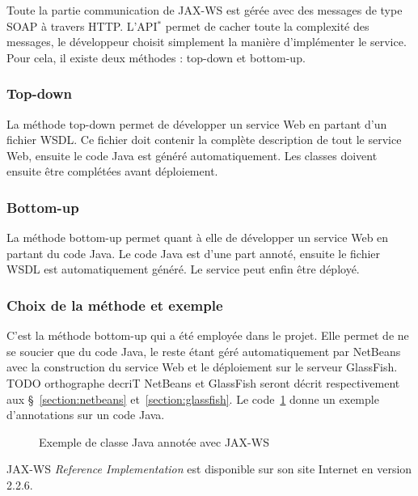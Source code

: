 Toute la partie communication de JAX-WS est g\'er\'ee avec des messages de type SOAP \`a travers HTTP.
L'API$^*$ permet de cacher toute la complexit\'e des messages, le d\'eveloppeur choisit simplement la mani\`ere d'impl\'ementer le service. 
Pour cela, il existe deux m\'ethodes : top-down et bottom-up.

\subsubsection{Top-down}

La m\'ethode top-down permet de d\'evelopper un service Web en partant d'un fichier WSDL.
Ce fichier doit contenir la compl\`ete description de tout le service Web, ensuite le code Java est g\'en\'er\'e automatiquement.
Les classes doivent ensuite \^etre compl\'et\'ees avant d\'eploiement.

\subsubsection{Bottom-up}

La m\'ethode bottom-up permet quant \`a elle de d\'evelopper un service Web en partant du code Java.
Le code Java est d'une part annot\'e, ensuite le fichier WSDL est automatiquement g\'en\'er\'e.
Le service peut enfin \^etre d\'eploy\'e.

\subsubsection{Choix de la m\'ethode et exemple}

C'est la m\'ethode bottom-up qui a \'et\'e employ\'ee dans le projet.
Elle permet de ne se soucier que du code Java, le reste \'etant g\'er\'e automatiquement par NetBeans avec la construction du service Web et le d\'eploiement sur le serveur GlassFish.
TODO orthographe decriT
NetBeans et GlassFish seront d\'ecrit respectivement aux \S~\ref{section:netbeans} et~\ref{section:glassfish}.
Le code~\ref{code:exempleJAXWS} donne un exemple d'annotations sur un code Java.

\vspace{0.20cm}

\begin{figure}[!ht]
	
	\caption{Exemple de classe Java annot\'ee avec JAX-WS}
	\label{code:exempleJAXWS}

\end{figure}

\vspace{0.20cm}

JAX-WS \textit{Reference Implementation} est disponible sur son site Internet\cite{biblio:siteJAXWS} en version 2.2.6.

\clearpage